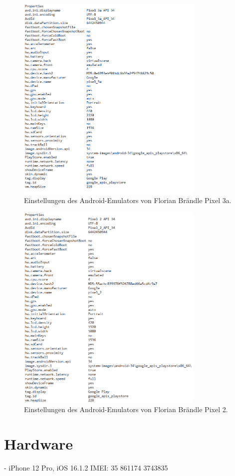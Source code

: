 \begin{figure}[H]
  \centering
  \includegraphics[width=0.8\textwidth]{images/android_emu_fb_1.png}
  \caption{Einstellungen des Android-Emulators von Florian Brändle Pixel 3a.}
\end{figure}

\begin{figure}[H]
  \centering
  \includegraphics[width=0.8\textwidth]{images/android_emu_fb_2.png}
  \caption{Einstellungen des Android-Emulators von Florian Brändle Pixel 2.}
\end{figure}

\section{Hardware}

-	iPhone 12 Pro, iOS 16.1.2
IMEI: 35 861174 3743835
